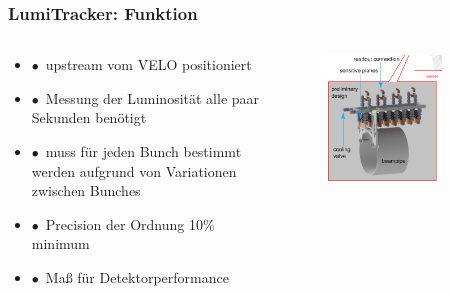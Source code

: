 \documentclass[aspectratio=1610, 12pt, xcolor=dvipsnames]{beamer}
\begin{document}
\begin{frame}\frametitle{LumiTracker: Funktion}
  \begin{columns}
    \begin{column}[c]{0.48\textwidth}
      \begin{itemize}
        \item $\bullet$\, upstream vom VELO positioniert
        \item $\bullet$\, Messung der Luminosität alle paar Sekunden benötigt
        \item $\bullet$\, muss für jeden Bunch bestimmt werden aufgrund von Variationen zwischen Bunches
        \item $\bullet$\, Precision der Ordnung 10\% minimum
        \item $\bullet$\, Maß für Detektorperformance
      \end{itemize}
    \end{column}
    \begin{column}[c]{0.48\textwidth}
      \begin{figure}
	       \centering
	       \includegraphics[width=0.8\textwidth]{plots/lumi.png}
      \end{figure}
    \end{column}
  \end{columns}
\end{frame}
\end{document}
